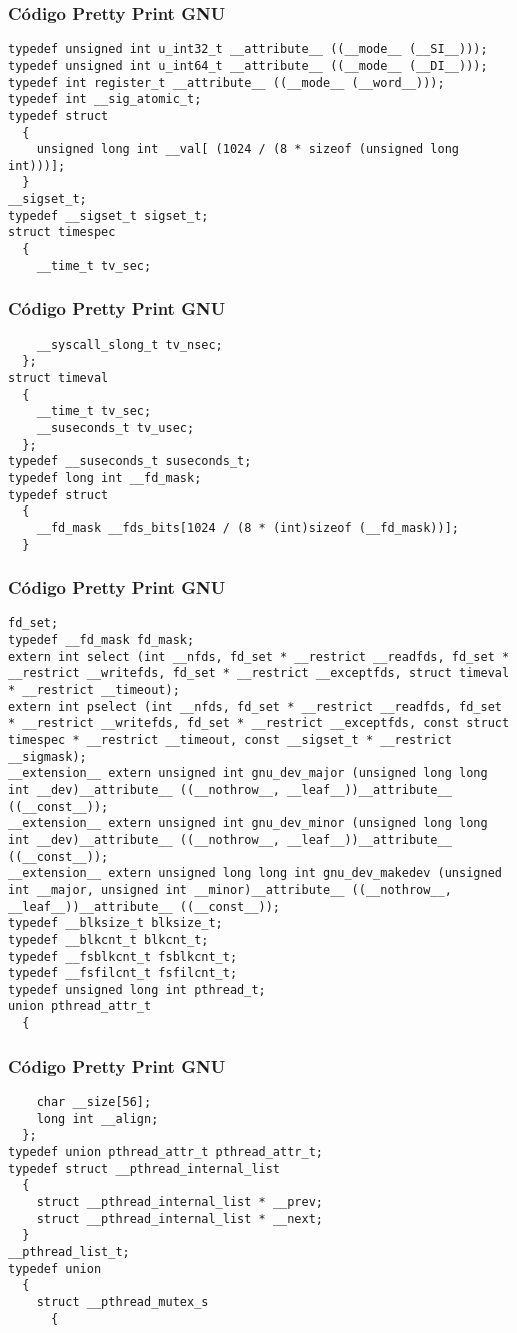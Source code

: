 \documentclass{beamer}
\begin{document}
\begin{frame}[fragile]
\frametitle{C\'odigo Pretty Print GNU}
\begin{verbatim}
typedef unsigned int u_int32_t __attribute__ ((__mode__ (__SI__)));
typedef unsigned int u_int64_t __attribute__ ((__mode__ (__DI__)));
typedef int register_t __attribute__ ((__mode__ (__word__)));
typedef int __sig_atomic_t;
typedef struct
  {
    unsigned long int __val[ (1024 / (8 * sizeof (unsigned long int)))];
  }
__sigset_t;
typedef __sigset_t sigset_t;
struct timespec
  {
    __time_t tv_sec;
\end{verbatim}
\end{frame}
\begin{frame}[fragile]
\frametitle{C\'odigo Pretty Print GNU}
\begin{verbatim}
    __syscall_slong_t tv_nsec;
  };
struct timeval
  {
    __time_t tv_sec;
    __suseconds_t tv_usec;
  };
typedef __suseconds_t suseconds_t;
typedef long int __fd_mask;
typedef struct
  {
    __fd_mask __fds_bits[1024 / (8 * (int)sizeof (__fd_mask))];
  }
\end{verbatim}
\end{frame}
\begin{frame}[fragile]
\frametitle{C\'odigo Pretty Print GNU}
\begin{verbatim}
fd_set;
typedef __fd_mask fd_mask;
extern int select (int __nfds, fd_set * __restrict __readfds, fd_set * __restrict __writefds, fd_set * __restrict __exceptfds, struct timeval * __restrict __timeout);
extern int pselect (int __nfds, fd_set * __restrict __readfds, fd_set * __restrict __writefds, fd_set * __restrict __exceptfds, const struct timespec * __restrict __timeout, const __sigset_t * __restrict __sigmask);
__extension__ extern unsigned int gnu_dev_major (unsigned long long int __dev)__attribute__ ((__nothrow__, __leaf__))__attribute__ ((__const__));
__extension__ extern unsigned int gnu_dev_minor (unsigned long long int __dev)__attribute__ ((__nothrow__, __leaf__))__attribute__ ((__const__));
__extension__ extern unsigned long long int gnu_dev_makedev (unsigned int __major, unsigned int __minor)__attribute__ ((__nothrow__, __leaf__))__attribute__ ((__const__));
typedef __blksize_t blksize_t;
typedef __blkcnt_t blkcnt_t;
typedef __fsblkcnt_t fsblkcnt_t;
typedef __fsfilcnt_t fsfilcnt_t;
typedef unsigned long int pthread_t;
union pthread_attr_t
  {
    \end{verbatim}
\end{frame}
\begin{frame}[fragile]
\frametitle{C\'odigo Pretty Print GNU}
\begin{verbatim}
    char __size[56];
    long int __align;
  };
typedef union pthread_attr_t pthread_attr_t;
typedef struct __pthread_internal_list
  {
    struct __pthread_internal_list * __prev;
    struct __pthread_internal_list * __next;
  }
__pthread_list_t;
typedef union
  {
    struct __pthread_mutex_s
      {
        \end{verbatim}
\end{frame}
\end{document}
